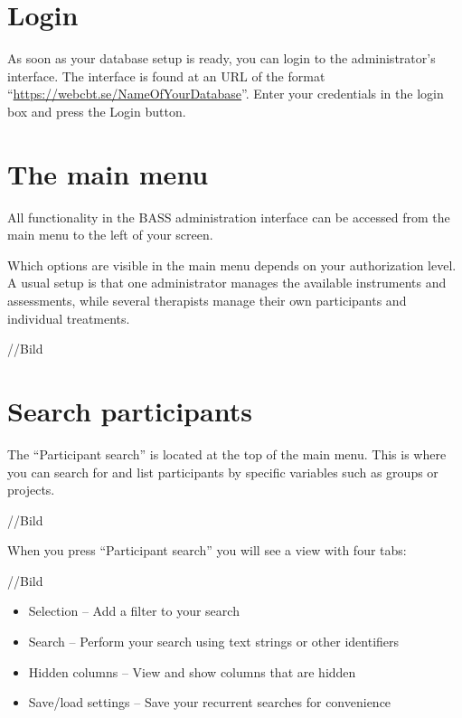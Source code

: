 \documentclass[]{book}
\providecommand{\tightlist}{%
  \setlength{\itemsep}{0pt}\setlength{\parskip}{0pt}}
\begin{document}
\hypertarget{login}{%
\chapter{Login}\label{login}}

As soon as your database setup is ready, you can login to the administrator's interface. The interface is found at an URL of the format ``\url{https://webcbt.se/NameOfYourDatabase}''. Enter your credentials in the login box and press the Login button.

\hypertarget{the-main-menu}{%
\chapter{The main menu}\label{the-main-menu}}

All functionality in the BASS administration interface can be accessed from the main menu to the left of your screen.

Which options are visible in the main menu depends on your authorization level. A usual setup is that one administrator manages the available instruments and assessments, while several therapists manage their own participants and individual treatments.

//Bild

\hypertarget{search-participants}{%
\chapter{Search participants}\label{search-participants}}

The ``Participant search'' is located at the top of the main menu. This is where you can search for and list participants by specific variables such as groups or projects.

//Bild

When you press ``Participant search'' you will see a view with four tabs:

//Bild

\begin{itemize}
\tightlist
\item
  Selection -- Add a filter to your search
\item
  Search -- Perform your search using text strings or other identifiers
\item
  Hidden columns -- View and show columns that are hidden
\item
  Save/load settings -- Save your recurrent searches for convenience
\end{itemize}
\end{document}
